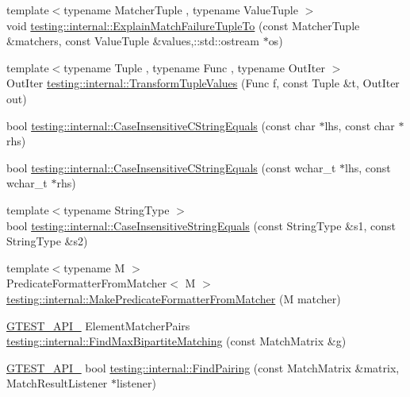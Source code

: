 \begin{DoxyCompactItemize}
\item 
{\footnotesize template$<$typename Matcher\+Tuple , typename Value\+Tuple $>$ }\\void \hyperlink{namespacetesting_1_1internal_afc791c20a43da984032e598698ac6ac4}{testing\+::internal\+::\+Explain\+Match\+Failure\+Tuple\+To} (const Matcher\+Tuple \&matchers, const Value\+Tuple \&values,\+::std\+::ostream $\ast$os)
\item 
{\footnotesize template$<$typename Tuple , typename Func , typename Out\+Iter $>$ }\\Out\+Iter \hyperlink{namespacetesting_1_1internal_a07ba091a64aa2ba95e41accc55dc8855}{testing\+::internal\+::\+Transform\+Tuple\+Values} (Func f, const Tuple \&t, Out\+Iter out)
\item 
bool \hyperlink{namespacetesting_1_1internal_aebfd0cd34de52d7973a5b2d03ba848cf}{testing\+::internal\+::\+Case\+Insensitive\+C\+String\+Equals} (const char $\ast$lhs, const char $\ast$rhs)
\item 
bool \hyperlink{namespacetesting_1_1internal_ad5b31f61a3cc5b4226d3560f5b48f4dd}{testing\+::internal\+::\+Case\+Insensitive\+C\+String\+Equals} (const wchar\+\_\+t $\ast$lhs, const wchar\+\_\+t $\ast$rhs)
\item 
{\footnotesize template$<$typename String\+Type $>$ }\\bool \hyperlink{namespacetesting_1_1internal_a383de24b1cca6648c14b03964c0ed843}{testing\+::internal\+::\+Case\+Insensitive\+String\+Equals} (const String\+Type \&s1, const String\+Type \&s2)
\item 
{\footnotesize template$<$typename M $>$ }\\Predicate\+Formatter\+From\+Matcher$<$ M $>$ \hyperlink{namespacetesting_1_1internal_a3fd0f30ec03d577bba3e1aa13241e17d}{testing\+::internal\+::\+Make\+Predicate\+Formatter\+From\+Matcher} (M matcher)
\item 
\hyperlink{gtest-port_8h_aa73be6f0ba4a7456180a94904ce17790}{G\+T\+E\+S\+T\+\_\+\+A\+P\+I\+\_\+} Element\+Matcher\+Pairs \hyperlink{namespacetesting_1_1internal_ae30bd8357c179334b2b09b0d689efccc}{testing\+::internal\+::\+Find\+Max\+Bipartite\+Matching} (const Match\+Matrix \&g)
\item 
\hyperlink{gtest-port_8h_aa73be6f0ba4a7456180a94904ce17790}{G\+T\+E\+S\+T\+\_\+\+A\+P\+I\+\_\+} bool \hyperlink{namespacetesting_1_1internal_af2bd2e350b56422a3d9d3b986ac1df0e}{testing\+::internal\+::\+Find\+Pairing} (const Match\+Matrix \&matrix, Match\+Result\+Listener $\ast$listener)
\item 

\end{DoxyCompactItemize}

